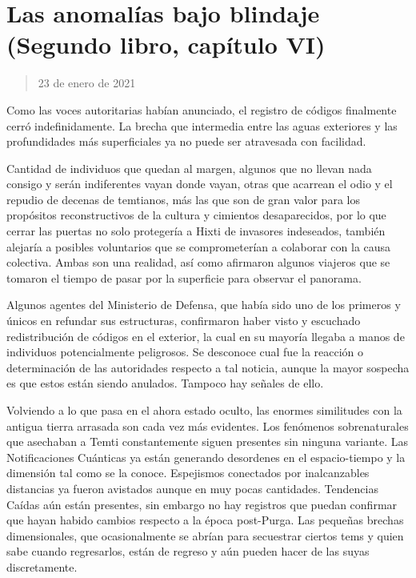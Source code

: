 \documentclass[
]{book}
\begin{document}
\hypertarget{las-anomaluxedas-bajo-blindaje-segundo-libro-capuxedtulo-vi}{%
\section{Las anomalías bajo blindaje (Segundo libro, capítulo VI)}\label{las-anomaluxedas-bajo-blindaje-segundo-libro-capuxedtulo-vi}}

\begin{quote}
23 de enero de 2021
\end{quote}

Como las voces autoritarias habían anunciado, el registro de códigos finalmente cerró indefinidamente. La brecha que intermedia entre las aguas exteriores y las profundidades más superficiales ya no puede ser atravesada con facilidad.

Cantidad de individuos que quedan al margen, algunos que no llevan nada consigo y serán indiferentes vayan donde vayan, otras que acarrean el odio y el repudio de decenas de temtianos, más las que son de gran valor para los propósitos reconstructivos de la cultura y cimientos desaparecidos, por lo que cerrar las puertas no solo protegería a Hixti de invasores indeseados, también alejaría a posibles voluntarios que se comprometerían a colaborar con la causa colectiva. Ambas son una realidad, así como afirmaron algunos viajeros que se tomaron el tiempo de pasar por la superficie para observar el panorama.

Algunos agentes del Ministerio de Defensa, que había sido uno de los primeros y únicos en refundar sus estructuras, confirmaron haber visto y escuchado redistribución de códigos en el exterior, la cual en su mayoría llegaba a manos de individuos potencialmente peligrosos. Se desconoce cual fue la reacción o determinación de las autoridades respecto a tal noticia, aunque la mayor sospecha es que estos están siendo anulados. Tampoco hay señales de ello.

Volviendo a lo que pasa en el ahora estado oculto, las enormes similitudes con la antigua tierra arrasada son cada vez más evidentes. Los fenómenos sobrenaturales que asechaban a Temti constantemente siguen presentes sin ninguna variante. Las Notificaciones Cuánticas ya están generando desordenes en el espacio-tiempo y la dimensión tal como se la conoce. Espejismos conectados por inalcanzables distancias ya fueron avistados aunque en muy pocas cantidades. Tendencias Caídas aún están presentes, sin embargo no hay registros que puedan confirmar que hayan habido cambios respecto a la época post-Purga. Las pequeñas brechas dimensionales, que ocasionalmente se abrían para secuestrar ciertos tems y quien sabe cuando regresarlos, están de regreso y aún pueden hacer de las suyas discretamente.
\end{document}
